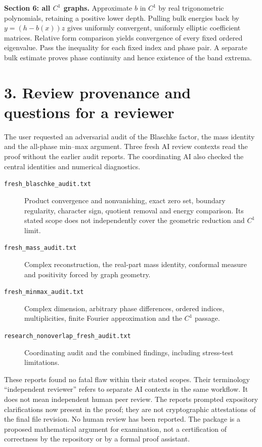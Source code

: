 \documentclass[11pt]{article}
\begin{document}
\textbf{Section 6: all $C^1$ graphs.}
Approximate $b$ in $C^1$ by real trigonometric polynomials, retaining a
positive lower depth. Pulling bulk energies back by $y=(h-b(x))z$ gives
uniformly convergent, uniformly elliptic coefficient matrices. Relative
form comparison yields convergence of every fixed ordered eigenvalue.
Pass the inequality for each fixed index and phase pair. A separate bulk
estimate proves phase continuity and hence existence of the band extrema.

\newpage
\section*{3. Review provenance and questions for a reviewer}
The user requested an adversarial audit of the Blaschke factor, the mass
identity and the all-phase min--max argument. Three fresh AI review
contexts read the proof without the earlier audit reports. The coordinating
AI also checked the central identities and numerical diagnostics.

\begin{description}
\item[\texttt{fresh\_blaschke\_audit.txt}] Product convergence and nonvanishing,
exact zero set, boundary regularity, character sign, quotient removal and
energy comparison. Its stated scope does not independently cover the
geometric reduction and $C^1$ limit.
\item[\texttt{fresh\_mass\_audit.txt}] Complex reconstruction, the real-part
mass identity, conformal measure and positivity forced by graph geometry.
\item[\texttt{fresh\_minmax\_audit.txt}] Complex dimension, arbitrary phase
differences, ordered indices, multiplicities, finite Fourier approximation
and the $C^1$ passage.
\item[\texttt{research\_nonoverlap\_fresh\_audit.txt}] Coordinating audit and
the combined findings, including stress-test limitations.
\end{description}
These reports found no fatal flaw within their stated scopes. Their
terminology ``independent reviewer'' refers to separate AI contexts in
the same workflow. It does not mean independent human peer review.
The reports prompted expository clarifications now present in the proof;
they are not cryptographic attestations of the final file revision.
No human review has been reported. The package is a proposed mathematical
argument for examination, not a certification of correctness by the
repository or by a formal proof assistant.
\end{document}
